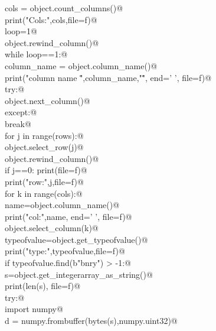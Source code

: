 \documentclass[10pt,a4paper,twoside,notitlepage]{article}
\begin{document}
\begin{flushleft}
\begin{minipage}{\linewidth}
\begin{list}{}{}
\mbox{}\verb@        cols = object.count_columns()@\\
\mbox{}\verb@        print("Cols:",cols,file=f)@\\
\mbox{}\verb@        loop=1@\\
\mbox{}\verb@        object.rewind_column()@\\
\mbox{}\verb@        while loop==1:@\\
\mbox{}\verb@            column_name = object.column_name()@\\
\mbox{}\verb@            print("column name \"",column_name,"\"", end=' ', file=f)@\\
\mbox{}\verb@            try:@\\
\mbox{}\verb@               object.next_column()@\\
\mbox{}\verb@            except:@\\
\mbox{}\verb@               break@\\
\mbox{}\verb@        for j in range(rows):@\\
\mbox{}\verb@            object.select_row(j)@\\
\mbox{}\verb@            object.rewind_column()@\\
\mbox{}\verb@            if j==0: print(file=f)@\\
\mbox{}\verb@            print("row:",j,file=f)@\\
\mbox{}\verb@            for k in range(cols):@\\
\mbox{}\verb@                name=object.column_name()@\\
\mbox{}\verb@                print("col:",name, end=' ', file=f)@\\
\mbox{}\verb@                object.select_column(k)@\\
\mbox{}\verb@                typeofvalue=object.get_typeofvalue()@\\
\mbox{}\verb@                print("type:",typeofvalue,file=f)@\\
\mbox{}\verb@                if typeofvalue.find(b"bnry") > -1:@\\
\mbox{}\verb@                    s=object.get_integerarray_as_string()@\\
\mbox{}\verb@                    print(len(s), file=f)@\\
\mbox{}\verb@                    try:@\\
\mbox{}\verb@                       import numpy@\\
\mbox{}\verb@                       d = numpy.frombuffer(bytes(s),numpy.uint32)@\\

\end{list}
\end{minipage}
\end{flushleft}
\end{document}
